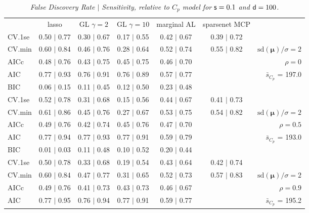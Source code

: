 \documentclass[12pt]{article}
\newcommand{\mr}[1]{\mathrm{#1}}
\newcommand{\bm}[1]{\mathbf{#1}}
\begin{document}
\begin{table}[p]\vspace{-.5cm}
\caption[l]{\label{sens}\it False Discovery Rate $\mid$ Sensitivity, relative to $C_p$ model  for ${\sf s}=0.1$ and ${\sf d}=100$.}
\vspace{-.5cm}
\small{}
\begin{center}
\begin{tabular}{l*{5}{c}|r}
 & lasso & GL $\gamma=2$ & GL $\gamma=10$ & marginal AL & sparsenet MCP  & \\
 \cline{1-7}
CV.1se & 0.50 $\mid$ 0.77 & 0.30 $\mid$ 0.67 & 0.17 $\mid$ 0.55 & 0.42 $\mid$ 0.67 & 0.39 $\mid$ 0.72 &\\
CV.min & 0.60 $\mid$ 0.84 & 0.46 $\mid$ 0.76 & 0.28 $\mid$ 0.64 & 0.52 $\mid$ 0.74 & 0.55 $\mid$ 0.82 &  $\mr{sd}(\bm{\mu})/\sigma=2$ \\
AICc & 0.48 $\mid$ 0.76 & 0.43 $\mid$ 0.75 & 0.45 $\mid$ 0.75 & 0.46 $\mid$ 0.70 & & $\rho=0$ \\
AIC & 0.77 $\mid$ 0.93 & 0.76 $\mid$ 0.91 & 0.76 $\mid$ 0.89 & 0.57 $\mid$ 0.77 & & \multirow{2}{*}{$\bar{s}_{C_p}$ = 197.0} \\
BIC & 0.06 $\mid$ 0.15 & 0.11 $\mid$ 0.45 & 0.12 $\mid$ 0.50 & 0.23 $\mid$ 0.48 & & \\
 \hline 
CV.1se & 0.52 $\mid$ 0.78 & 0.31 $\mid$ 0.68 & 0.15 $\mid$ 0.56 & 0.44 $\mid$ 0.67 & 0.41 $\mid$ 0.73 &\\
CV.min & 0.61 $\mid$ 0.86 & 0.45 $\mid$ 0.76 & 0.27 $\mid$ 0.67 & 0.53 $\mid$ 0.75 & 0.54 $\mid$ 0.82 &  $\mr{sd}(\bm{\mu})/\sigma=2$ \\
AICc & 0.49 $\mid$ 0.76 & 0.42 $\mid$ 0.74 & 0.45 $\mid$ 0.76 & 0.47 $\mid$ 0.70 & & $\rho=0.5$ \\
AIC & 0.77 $\mid$ 0.94 & 0.77 $\mid$ 0.93 & 0.77 $\mid$ 0.91 & 0.59 $\mid$ 0.79 & & \multirow{2}{*}{$\bar{s}_{C_p}$ = 193.0} \\
BIC & 0.01 $\mid$ 0.03 & 0.11 $\mid$ 0.48 & 0.10 $\mid$ 0.52 & 0.20 $\mid$ 0.44 & & \\
 \hline 
CV.1se & 0.50 $\mid$ 0.78 & 0.33 $\mid$ 0.68 & 0.19 $\mid$ 0.54 & 0.43 $\mid$ 0.64 & 0.42 $\mid$ 0.74 &\\
CV.min & 0.60 $\mid$ 0.84 & 0.47 $\mid$ 0.77 & 0.31 $\mid$ 0.65 & 0.52 $\mid$ 0.73 & 0.57 $\mid$ 0.83 &  $\mr{sd}(\bm{\mu})/\sigma=2$ \\
AICc & 0.49 $\mid$ 0.76 & 0.41 $\mid$ 0.73 & 0.43 $\mid$ 0.73 & 0.46 $\mid$ 0.67 & & $\rho=0.9$ \\
AIC & 0.77 $\mid$ 0.95 & 0.76 $\mid$ 0.94 & 0.77 $\mid$ 0.91 & 0.59 $\mid$ 0.77 & & \multirow{2}{*}{$\bar{s}_{C_p}$ = 195.2} \\

\end{tabular}
\end{center}
\end{table}
\end{document}
